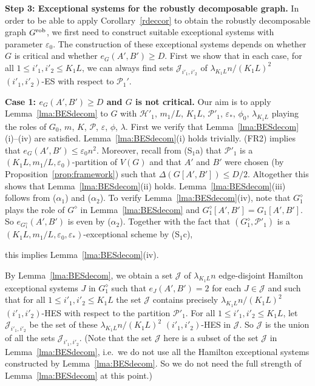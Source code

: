 \documentclass{memo-l}
\def\COMMENT#1{}
\def\cP{\mathcal{P}}
\def\eps{\varepsilon}
\def\cJ{\mathcal{J}}
\numberwithin{section}{chapter}
\numberwithin{equation}{section}
\numberwithin{firstthm}{section}
\numberwithin{figure}{section}
\begin{document}
{\smallskip

\noindent\textbf{Step 3: Exceptional systems for the robustly decomposable graph.}
In order to be able to apply Corollary~\ref{rdeccor} to obtain the robustly decomposable graph $G^{\rm rob}$, we first need to construct
suitable exceptional systems with parameter $\eps_0$. The construction of these exceptional systems depends on whether $G$ is critical and whether $e_G(A',B') \ge D$.
First we show that in each case, for all $1 \le i'_1, i'_2  \le K_1L$, we can always find sets $\cJ_{i'_1,i'_2}$ of $\lambda_{K_1L} n/(K_1 L)^2$ $(i'_1,i'_2)$-ES
with respect to $\mathcal{P}_1'$.

\noindent\textbf{Case 1: $e_G(A',B') \ge D$ and $G$ is not critical.}
Our aim is to apply Lemma~\ref{lma:BESdecom} to $G$ with $\mathcal{H}'_1$, $m_1/L$, $K_1L$, $\cP'_1$, $\eps_*$, $\phi_0$, $\lambda_{K_1L}$
playing the roles of $G_0$, $m$, $K$, $\cP$, $\eps$, $\phi$, $\lambda$.
First we verify that Lemma~\ref{lma:BESdecom}(i)--(iv) are satisfied. 
Lemma~\ref{lma:BESdecom}(i) holds trivially.
(FR2) implies that $e_G(A',B') \le \eps_0 n^2$.
Moreover, recall from (S$_1$a) that $\cP'_1$ is a $(K_1L,m_1/L,\eps_0)$-partition of $V(G)$ and that $A'$ and $B'$ were chosen
(by Proposition~\ref{prop:framework}) such that $\Delta(G[A',B']) \le D/2$. Altogether this shows that Lemma~\ref{lma:BESdecom}(ii) holds.
Lemma~\ref{lma:BESdecom}(iii) follows from ($\alpha_1$) and ($\alpha_2$). To verify Lemma~\ref{lma:BESdecom}(iv),
note that $G^{\diamond}_1$ plays the role of $G^{\diamond}$ in Lemma~\ref{lma:BESdecom} and $G^{\diamond}_1[A',B'] = G_1[A',B']$.
So $e_{G^{\diamond}_1}(A',B')$ is even by ($\alpha_2$).
Together with the fact that $(G^{\diamond}_1, \cP'_1)$ is a $(K_1L, m_1/L, \eps_0, \eps_*)$-exceptional scheme by (S$_1$c),%
    \COMMENT{Daniela: added ref to (S$_1$c)}
this implies Lemma~\ref{lma:BESdecom}(iv).

By Lemma~\ref{lma:BESdecom}, we obtain a set $\cJ$ of $\lambda_{K_1L} n$ edge-disjoint Hamilton exceptional systems $J$ in
$G_1^\diamond$ such that $e_J(A',B') =2 $ for each $J \in \cJ$ and such that
for all $1 \le i'_1, i'_2  \le K_1L$ the set $\cJ$ contains precisely $\lambda_{K_1L} n/(K_1 L)^2$ $(i'_1,i'_2)$-HES with respect to the partition $\cP'_1$.
For all $1 \le i'_1, i'_2  \le K_1L$, let $\cJ_{i'_1,i'_2}$ be the set of these $\lambda_{K_1L} n/(K_1 L)^2$ $(i'_1,i'_2)$-HES in $\cJ$.
So $\cJ$ is the union of all the sets $\cJ_{i'_1,i'_2}$.
(Note that the set $\cJ$ here is a subset of the set $\cJ$ in Lemma~\ref{lma:BESdecom}, i.e.~we do not use all the Hamilton
exceptional systems constructed by Lemma~\ref{lma:BESdecom}. So we do not need the full strength of Lemma~\ref{lma:BESdecom} at this point.)


}
\end{document}
